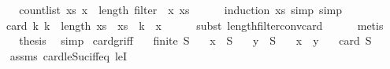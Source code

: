 \begin{isabellebody}
%
\isadelimproof
%
\endisadelimproof
%
\isatagproof
{}\isamarkupfalse%
\ {\isacharminus}{\kern0pt}\isanewline
\ \ \isamarkupfalse%
\ {\isachardoublequoteopen}count{\isacharunderscore}{\kern0pt}list\ xs\ x\ {\isacharequal}{\kern0pt}\ length\ {\isacharparenleft}{\kern0pt}filter\ {\isacharparenleft}{\kern0pt}{\isacharparenleft}{\kern0pt}{\isacharequal}{\kern0pt}{\isacharparenright}{\kern0pt}\ x{\isacharparenright}{\kern0pt}\ xs{\isacharparenright}{\kern0pt}{\isachardoublequoteclose}\isanewline
\ \ \ \ \isamarkupfalse%
\ {\isacharparenleft}{\kern0pt}induction\ xs{\isacharcomma}{\kern0pt}\ simp{\isacharcomma}{\kern0pt}\ simp{\isacharparenright}{\kern0pt}\isanewline
\ \ \isamarkupfalse%
\ \isamarkupfalse%
\ {\isachardoublequoteopen}{\isachardot}{\kern0pt}{\isachardot}{\kern0pt}{\isachardot}{\kern0pt}\ {\isacharequal}{\kern0pt}\ card\ {\isacharbraceleft}{\kern0pt}k{\isachardot}{\kern0pt}\ k\ {\isacharless}{\kern0pt}\ length\ xs\ {\isasymand}\ xs\ {\isacharbang}{\kern0pt}\ k\ {\isacharequal}{\kern0pt}\ x{\isacharbraceright}{\kern0pt}{\isachardoublequoteclose}\isanewline
\ \ \ \ \isamarkupfalse%
\ {\isacharparenleft}{\kern0pt}subst\ length{\isacharunderscore}{\kern0pt}filter{\isacharunderscore}{\kern0pt}conv{\isacharunderscore}{\kern0pt}card{\isacharparenright}{\kern0pt}\isanewline
\ \ \ \ \isamarkupfalse%
\ metis\isanewline
\ \ \isamarkupfalse%
\ \isamarkupfalse%
\ {\isacharquery}{\kern0pt}thesis\ \isamarkupfalse%
\ simp\isanewline
{}\isamarkupfalse%
%
\endisatagproof
{\isafoldproof}%
%
\isadelimproof
\isanewline
%
\endisadelimproof
\isanewline
{}\isamarkupfalse%
\ card{\isacharunderscore}{\kern0pt}gr{\isacharunderscore}{\kern0pt}{}{\isacharunderscore}{\kern0pt}iff{\isacharcolon}{\kern0pt}\isanewline
\ \ \ {\isachardoublequoteopen}finite\ S{\isachardoublequoteclose}\isanewline
\ \ \ {\isachardoublequoteopen}x\ {\isasymin}\ S{\isachardoublequoteclose}\isanewline
\ \ \ {\isachardoublequoteopen}y\ {\isasymin}\ S{\isachardoublequoteclose}\isanewline
\ \ \ {\isachardoublequoteopen}x\ {\isasymnoteq}\ y{\isachardoublequoteclose}\isanewline
\ \ \ {\isachardoublequoteopen}card\ S\ {\isachargreater}{\kern0pt}\ {}{\isachardoublequoteclose}\isanewline
%
\isadelimproof
\ \ %
\endisadelimproof
%
\isatagproof
{}\isamarkupfalse%
\ assms\ card{\isacharunderscore}{\kern0pt}le{\isacharunderscore}{\kern0pt}Suc{}{\isacharunderscore}{\kern0pt}iff{\isacharunderscore}{\kern0pt}eq\ leI\ \isamarkupfalse%

\end{isabellebody}
